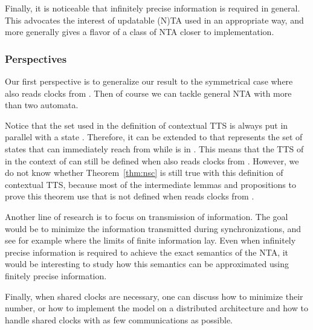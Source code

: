 \documentclass{LMCS}
\theoremstyle{plain}\newtheorem*{prop11}{Proposition~\ref{prop:states} bis}
\begin{document}
Finally, it is noticeable that infinitely precise information is required in
general. This advocates the interest of updatable (N)TA used in an appropriate
way, and more generally gives a flavor of a class of NTA closer to
implementation.

\subsubsection*{Perspectives}
Our first perspective is to generalize our result to the symmetrical case where
 also reads clocks from . Then of course we can tackle general NTA
with more than two automata.

Notice that the set  used in the definition of contextual TTS is
always put in parallel with a state . Therefore, it can be extended to
 that represents the set of states that  can immediately
reach from  while  is in . This means that the TTS of
 in the context of  can still be defined when
 also reads clocks from .
However, we do not know whether Theorem~\ref{thm:nsc} is still true with this
definition of contextual TTS, because most of the intermediate lemmas and
propositions to prove this theorem use  that is not defined
when  reads clocks from .

Another line of research is to focus on transmission of information. The
goal would be to minimize the information transmitted during synchronizations,
and see for example where the limits of finite information lay.
Even when infinitely precise information is required to achieve the exact
semantics of the NTA, it would be interesting to study how this semantics can be
approximated using finitely precise information.

Finally, when shared clocks are necessary, one can discuss how to minimize their
number, or how to implement the model on a distributed architecture and how to
handle shared clocks with as few communications as possible.

\pagebreak


\end{document}
